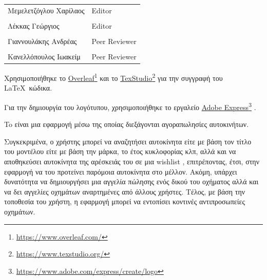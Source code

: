 \documentclass{../ol-softwaremanual}
\newcommand{\doclink}[2]{\href{#1}{#2}\footnote{\url{#1}}}
\begin{document}
	
	\vspace{40pt}
	
	\begin{table}[htbp!]
		\begin{tabular}{ll}
			Μεμελετζόγλου Χαρίλαος & \en Editor \\
			\\ Λέκκας Γεώργιος      &   \en  Editor \\
			\\ Γιαννουλάκης Ανδρέας & \en Peer Reviewer \\
			\\ Κανελλόπουλος Ιωακείμ & \en Peer Reviewer
		\end{tabular}
	\end{table}
	
	
	\vspace{40pt}
	
	
	\vspace{20pt}
	
	Χρησιμοποιήθηκε το \en \doclink{https://www.overleaf.com/}{Overleaf} \gr και το \en \doclink{https://www.texstudio.org/}{TexStudio} \gr για την συγγραφή του \LaTeX\ κώδικα. \break
	
	Για την δημιουργία του λογότυπου, χρησιμοποιήθηκε το εργαλείο \en \doclink{https://www.adobe.com/express/create/logo}{Adobe Express} . \gr
	
	
	\newpage
	
	
	\vspace{60pt}
	
	\flushleft
	
	To  \gr είναι μια εφαρμογή μέσω της οποίας διεξάγονται αγοραπωλησίες αυτοκινήτων. \hfill \break
	
	Συγκεκριμένα, ο χρήστης μπορεί να αναζητήσει αυτοκίνητα είτε με βάση τον τίτλο του μοντέλου είτε με βάση την μάρκα, το έτος κυκλοφορίας κλπ, αλλά και να αποθηκεύσει αυτοκίνητα της αρέσκειάς του σε μια \en wishlist \gr, επιτρέποντας, έτσι, στην εφαρμογή να του προτείνει παρόμοια αυτοκίνητα στο μέλλον.
	Ακόμη, υπάρχει δυνατότητα να δημιουργήσει μια αγγελία πώλησης ενός δικού του οχήματος αλλά και να δει αγγελίες οχημάτων αναρτημένες από άλλους χρήστες.
	Τέλος, με βάση την τοποθεσία του χρήστη, η εφαρμογή μπορεί να εντοπίσει κοντινές αντιπροσωπείες οχημάτων. \hfill \break
	
\end{document}
